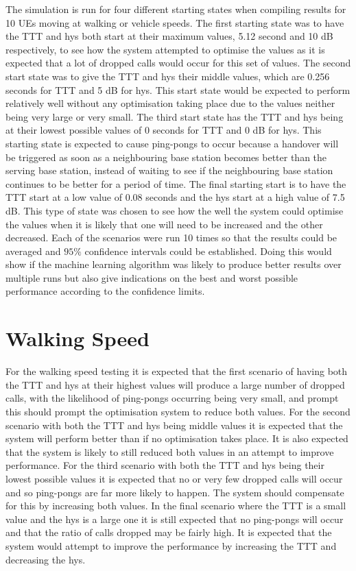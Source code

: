 The simulation is run for four different starting states when compiling results for 10 UEs moving at walking or vehicle speeds. The first starting state was to have the TTT and hys both start at their maximum values, 5.12 second and 10 dB respectively, to see how the system attempted to optimise the values as it is expected that a lot of dropped calls would occur for this set of values. The second start state was to give the TTT and hys their middle values, which are 0.256 seconds for TTT and 5 dB for hys. This start state would be expected to perform relatively well without any optimisation taking place due to the values neither being very large or very small. The third start state has the TTT and hys being at their lowest possible values of 0 seconds for TTT and 0 dB for hys. This starting state is expected to cause ping-pongs to occur because a handover will be triggered as soon as a neighbouring base station becomes better than the serving base station, instead of waiting to see if the neighbouring base station continues to be better for a period of time. The final starting start is to have the TTT start at a low value of 0.08 seconds and the hys start at a high value of 7.5 dB. This type of state was chosen to see how the well the system could optimise the values when it is likely that one will need to be increased and the other decreased. Each of the scenarios were run 10 times so that the results could be averaged and $95\%$ confidence intervals could be established. Doing this would show if the machine learning algorithm was likely to produce better results over multiple runs but also give indications on the best and worst possible performance according to the confidence limits.
\section{Walking Speed}\label{walk}
For the walking speed testing it is expected that the first scenario of having both the TTT and hys at their highest values will produce a large number of dropped calls, with the likelihood of ping-pongs occurring being very small, and prompt this should prompt the optimisation system to reduce both values. For the second scenario with both the TTT and hys being middle values it is expected that the system will perform better than if no optimisation takes place. It is also expected that the system is likely to still reduced both values in an attempt to improve performance. For the third scenario with both the TTT and hys being their lowest possible values it is expected that no or very few dropped calls will occur and so ping-pongs are far more likely to happen. The system should compensate for this by increasing both values. In the final scenario where the TTT is a small value and the hys is a large one it is still expected that no ping-pongs will occur and that the ratio of calls dropped may be fairly high. It is expected that the system would attempt to improve the performance by increasing the TTT and decreasing the hys.
